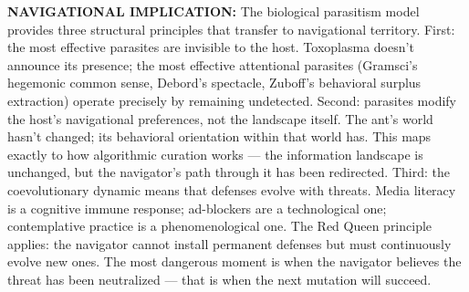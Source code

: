 \textbf{NAVIGATIONAL IMPLICATION:} The biological parasitism model provides three structural principles that transfer to navigational territory. First: the most effective parasites are invisible to the host. Toxoplasma doesn't announce its presence; the most effective attentional parasites (Gramsci's hegemonic common sense, Debord's spectacle, Zuboff's behavioral surplus extraction) operate precisely by remaining undetected. Second: parasites modify the host's navigational preferences, not the landscape itself. The ant's world hasn't changed; its behavioral orientation within that world has. This maps exactly to how algorithmic curation works — the information landscape is unchanged, but the navigator's path through it has been redirected. Third: the coevolutionary dynamic means that defenses evolve with threats. Media literacy is a cognitive immune response; ad-blockers are a technological one; contemplative practice is a phenomenological one. The Red Queen principle applies: the navigator cannot install permanent defenses but must continuously evolve new ones. The most dangerous moment is when the navigator believes the threat has been neutralized — that is when the next mutation will succeed.


\bigskip\noindent\makebox[\textwidth]{\color{rulegray}\rule{5cm}{0.3pt}}\bigskip
